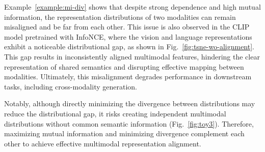 
Example~\ref{example:mi-div} shows that despite strong dependence and high mutual information, the representation distributions of two modalities can remain misaligned and be far from each other. This issue is also observed in the CLIP model pretrained with InfoNCE, where the vision and language representations exhibit a noticeable distributional gap, as shown in Fig.~\ref{fig:tsne-wo-alignment}. This gap results in inconsistently aligned multimodal features, hindering the clear representation of shared semantics and disrupting effective mapping between modalities. Ultimately, this misalignment degrades performance in downstream tasks, including cross-modality generation.


Notably, although directly minimizing the divergence between distributions may reduce the distributional gap, it risks creating independent multimodal distributions without common semantic information (Fig.~\ref{fig:toy3}). {Therefore, maximizing mutual information and minimizing divergence complement each other to achieve effective multimodal representation alignment.}






